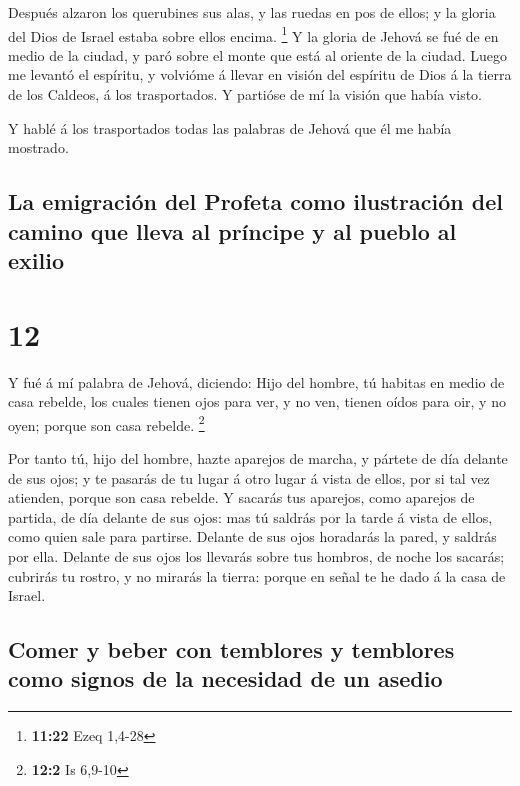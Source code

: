 Después alzaron los querubines sus alas, y las ruedas en
pos de ellos; y la gloria del Dios de Israel estaba sobre ellos encima.
\footnote{\textbf{11:22} Ezeq 1,4-28}  Y la gloria de
Jehová se fué de en medio de la ciudad, y paró sobre el monte que está
al oriente de la ciudad.  Luego me levantó el espíritu, y
volvióme á llevar en visión del espíritu de Dios á la tierra de los
Caldeos, á los trasportados. Y partióse de mí la visión que había visto.

 Y hablé á los trasportados todas las palabras de Jehová
que él me había mostrado.

\hypertarget{la-emigraciuxf3n-del-profeta-como-ilustraciuxf3n-del-camino-que-lleva-al-pruxedncipe-y-al-pueblo-al-exilio}{%
\subsection{La emigración del Profeta como ilustración del camino que
lleva al príncipe y al pueblo al
exilio}\label{la-emigraciuxf3n-del-profeta-como-ilustraciuxf3n-del-camino-que-lleva-al-pruxedncipe-y-al-pueblo-al-exilio}}

\hypertarget{section-11}{%
\section{12}\label{section-11}}

 Y fué á mí palabra de Jehová, diciendo: 
Hijo del hombre, tú habitas en medio de casa rebelde, los cuales tienen
ojos para ver, y no ven, tienen oídos para oir, y no oyen; porque son
casa rebelde. \footnote{\textbf{12:2} Is 6,9-10}

 Por tanto tú, hijo del hombre, hazte aparejos de marcha,
y pártete de día delante de sus ojos; y te pasarás de tu lugar á otro
lugar á vista de ellos, por si tal vez atienden, porque son casa
rebelde.  Y sacarás tus aparejos, como aparejos de
partida, de día delante de sus ojos: mas tú saldrás por la tarde á vista
de ellos, como quien sale para partirse.  Delante de sus
ojos horadarás la pared, y saldrás por ella.  Delante de
sus ojos los llevarás sobre tus hombros, de noche los sacarás; cubrirás
tu rostro, y no mirarás la tierra: porque en señal te he dado á la casa
de Israel.

\hypertarget{comer-y-beber-con-temblores-y-temblores-como-signos-de-la-necesidad-de-un-asedio}{%
\subsection{Comer y beber con temblores y temblores como signos de la
necesidad de un
asedio}\label{comer-y-beber-con-temblores-y-temblores-como-signos-de-la-necesidad-de-un-asedio}}

